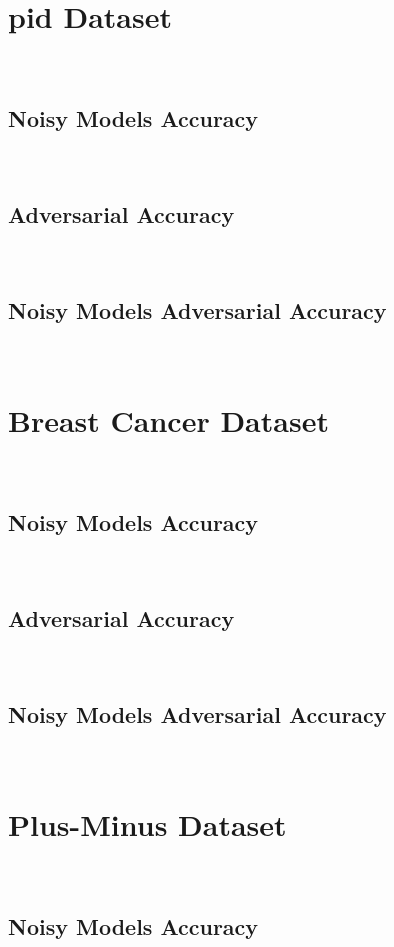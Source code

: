 \section{\acl{pid} Dataset}\label{section:diabetes-eval} \

\subsection{Noisy Models Accuracy}\label{subsection:diabetes-noisy-acc} \

\subsection{Adversarial Accuracy}\label{subsection:diabetes-adv-acc} \

\subsection{Noisy Models Adversarial Accuracy}\label{subsection:diabetes-noisy-adv-acc} \

\section{Breast Cancer Dataset}\label{section:breast-cancer-eval} \

\subsection{Noisy Models Accuracy}\label{subsection:breast-cancer-noisy-acc} \

\subsection{Adversarial Accuracy}\label{subsection:breast-cancer-adv-acc} \

\subsection{Noisy Models Adversarial Accuracy}\label{subsection:breast-cancer-noisy-adv-acc} \

\section{Plus-Minus Dataset}\label{section:plus-minus-eval} \

\subsection{Noisy Models Accuracy}\label{subsection:plus-minus-noisy-acc} \

